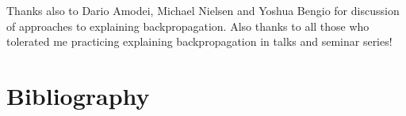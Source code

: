 \documentclass[a4paper,12pt]{report}%
\begin{document}
Thanks also to Dario Amodei, Michael Nielsen and Yoshua Bengio for discussion of approaches to explaining backpropagation. Also thanks to all those who tolerated me practicing explaining backpropagation in talks and seminar series!



\newpage
\chapter{\color{IAF} \bf Bibliography}
%
\end{document}
